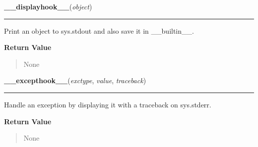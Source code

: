     \label{sys:displayhook}

    \vspace{0.5ex}

\hspace{.8\funcindent}\begin{boxedminipage}{\funcwidth}

    \raggedright \textbf{\_\_displayhook\_\_}(\textit{object})

    \vspace{-1.5ex}

    \rule{\textwidth}{0.5\fboxrule}
\setlength{\parskip}{2ex}
    Print an object to sys.stdout and also save it in \_\_builtin\_\_.

\setlength{\parskip}{1ex}
      \textbf{Return Value}
    \vspace{-1ex}

      \begin{quote}
      None

      \end{quote}

    \end{boxedminipage}

    \label{sys:__excepthook__}

    \vspace{0.5ex}

\hspace{.8\funcindent}\begin{boxedminipage}{\funcwidth}

    \raggedright \textbf{\_\_excepthook\_\_}(\textit{exctype}, \textit{value}, \textit{traceback})

    \vspace{-1.5ex}

    \rule{\textwidth}{0.5\fboxrule}
\setlength{\parskip}{2ex}
    Handle an exception by displaying it with a traceback on sys.stderr.

\setlength{\parskip}{1ex}
      \textbf{Return Value}
    \vspace{-1ex}

      \begin{quote}
      None

      \end{quote}

    \end{boxedminipage}

    \label{sys:call_tracing}

